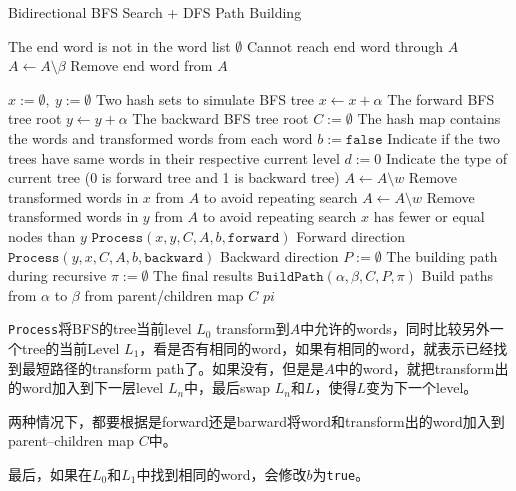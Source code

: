 \setcounter{algorithm}{0}
\begin{algorithm}[H]
\caption{Bidirectional BFS Search + DFS Path Building}
\begin{algorithmic}[1]
 \Comment The end word is not in the word list
\State \Return $\emptyset$ \Comment Cannot reach end word through $A$
\EndIf
\State $A\gets A\setminus \beta$ \Comment Remove end word from $A$
\end{algorithmic}
\end{algorithm}
\begin{algorithm}[H]
\begin{algorithmic}[1]
\State $x:=\emptyset,\ y:=\emptyset$ \Comment Two hash sets to simulate BFS tree
\State $x\gets x + \alpha$ \Comment The forward BFS tree root
\State $y\gets y + \alpha$ \Comment The backward BFS tree root
\State $C:=\emptyset$ \Comment The hash map contains the words and transformed words from each word
\State $b:=\texttt{false}$ \Comment Indicate if the two trees have same words in their respective current level
\State $d:=0$ \Comment Indicate the type of current tree (0 is forward tree and 1 is backward tree)
\State $A\gets A\setminus w$ \Comment Remove transformed words in $x$ from $A$ to avoid repeating search
\EndFor
{}
\State $A\gets A\setminus w$ \Comment Remove transformed words in $y$ from $A$ to avoid repeating search
\EndFor
{} \Comment $x$ has fewer or equal nodes than $y$
\State $\texttt{Process}(x, y, C, A, b, \texttt{forward})$ \Comment Forward direction
\Else 
\State $\texttt{Process}(y, x, C, A, b, \texttt{backward})$ \Comment Backward direction
\EndIf
\EndWhile
\State $P:=\emptyset$ \Comment The building path during recursive
\State $\pi:=\emptyset$ \Comment The final results
\State $\texttt{BuildPath}(\alpha, \beta, C, P, \pi)$ \Comment Build paths from $\alpha$ to $\beta$ from parent/children map $C$
\State \Return $pi$
\EndProcedure
\end{algorithmic}
\end{algorithm}
\begin{CJK*}{UTF8}{gbsn}
\texttt{Process}将BFS的tree当前level $L_0$ transform到$A$中允许的words，同时比较另外一个tree的当前Level $L_1$，看是否有相同的word，如果有相同的word，就表示已经找到最短路径的transform path了。如果没有，但是是$A$中的word，就把transform出的word加入到下一层level $L_n$中，最后swap $L_n$和$L$，使得$L$变为下一个level。
\par
两种情况下，都要根据是forward还是barward将word和transform出的word加入到parent--children map $C$中。
\par
最后，如果在$L_0$和$L_1$中找到相同的word，会修改$b$为\texttt{true}。
\end{CJK*}
